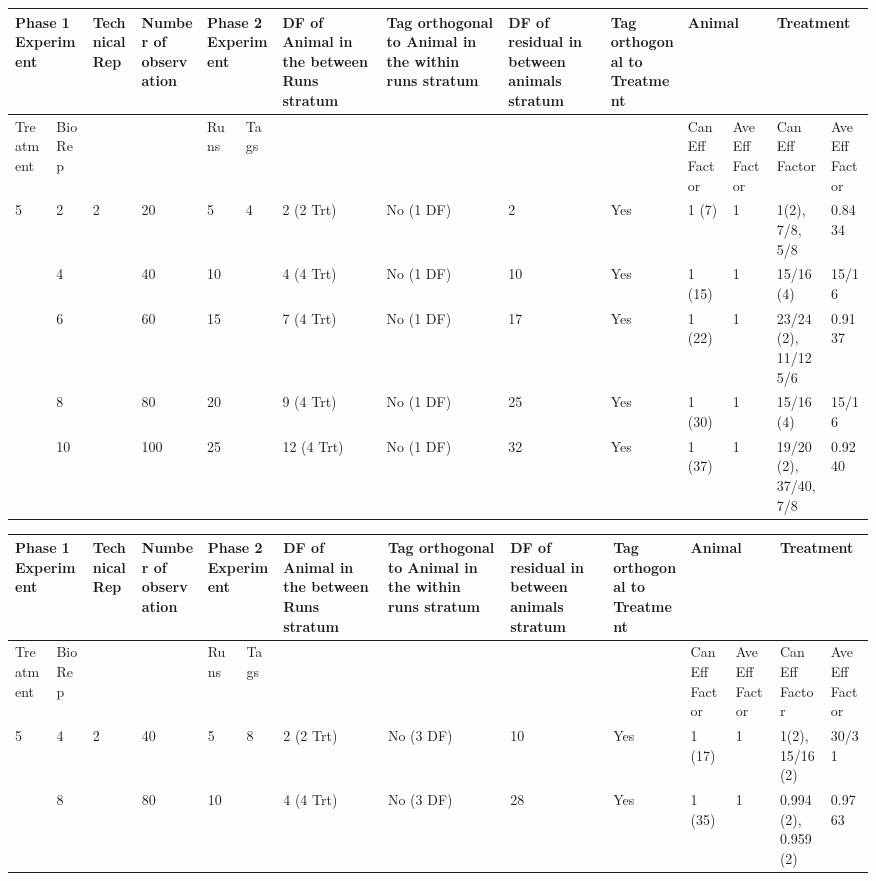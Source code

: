\begin{tabular}{|p{0.5in}|p{0.3in}|p{0.5in}|p{0.7in}|p{0.3in}|p{0.3in}|p{0.7in}|p{0.7in}|p{0.6in}|p{0.6in}|p{0.4in}|p{0.4in}|p{0.5in}|p{0.4in}|} \hline 
\multicolumn{2}{|p{1in}|}{Phase 1 Experiment} & Technical Rep & Number of observation  & \multicolumn{2}{|p{0.7in}|}{Phase 2 Experiment} & DF of Animal in the between Runs stratum  & Tag orthogonal to Animal in the within runs stratum & DF of residual in between animals stratum & Tag orthogonal to Treatment & \multicolumn{2}{|p{0.8in}|}{Animal} & \multicolumn{2}{|p{0.9in}|}{Treatment} \\ \hline 
Treatment & Bio Rep &  &  & Runs & Tags  &  &  &  &  & Can Eff Factor & Ave Eff Factor & Can Eff Factor & Ave Eff Factor \\ \hline 
5 & 2 & 2 & 20 & 5 & 4 & 2 (2 Trt) & No (1 DF) & 2 & Yes & 1 (7) & 1 & 1(2), 7/8, 5/8 & 0.8434 \\ \hline 
 & 4 &  & 40 & 10 &  & 4 (4 Trt) & No (1 DF) & 10 & Yes & 1 (15) & 1 & 15/16(4) & 15/16 \\ \hline 
 & 6 &  & 60 & 15 &  & 7 (4 Trt) & No (1 DF) & 17 & Yes & 1 (22) & 1 & 23/24(2), 11/12   5/6 & 0.9137 \\ \hline 
 & 8 &  & 80 & 20 &  & 9 (4 Trt) & No (1 DF) & 25 & Yes & 1 (30) & 1 & 15/16(4) & 15/16 \\ \hline 
 & 10 &  & 100 & 25 &  & 12 (4 Trt) & No (1 DF) & 32 & Yes & 1 (37) & 1 & 19/20(2), 37/40,   7/8 & 0.9240 \\ \hline 
\end{tabular}



\noindent 

\begin{tabular}{|p{0.5in}|p{0.3in}|p{0.5in}|p{0.7in}|p{0.3in}|p{0.3in}|p{0.7in}|p{0.7in}|p{0.6in}|p{0.6in}|p{0.4in}|p{0.4in}|p{0.5in}|p{0.4in}|} \hline 
\multicolumn{2}{|p{1in}|}{Phase 1 Experiment} & Technical Rep & Number of observation  & \multicolumn{2}{|p{0.7in}|}{Phase 2 Experiment} & DF of Animal in the between Runs stratum  & Tag orthogonal to Animal in the within runs stratum & DF of residual in between animals stratum & Tag orthogonal to Treatment & \multicolumn{2}{|p{0.8in}|}{Animal} & \multicolumn{2}{|p{0.9in}|}{Treatment} \\ \hline 
Treatment & Bio Rep &  &  & Runs & Tags  &  &  &  &  & Can Eff Factor & Ave Eff Factor & Can Eff Factor & Ave Eff Factor \\ \hline 
5 & 4 & 2 & 40 & 5 & 8 & 2 (2 Trt) & No (3 DF) & 10 & Yes & 1 (17) & 1 & 1(2), 15/16(2) & 30/31 \\ \hline 
 & 8 &  & 80 & 10 &  & 4 (4 Trt) & No (3 DF) & 28 & Yes & 1 (35) & 1 & 0.994 (2), 0.959(2) & 0.9763 \\ \hline 
\end{tabular}



